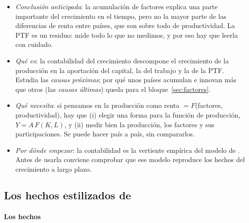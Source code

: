 \documentclass[11pt]{article}
\begin{document}
\begin{itemize}
\item \emph{Conclusión anticipada}: la acumulación de factores explica una parte importante del crecimiento en el tiempo, pero no la mayor parte de las diferencias de renta entre países, que son sobre todo de productividad. La PTF es un residuo: mide todo lo que no medimos, y por eso hay que leerla con cuidado.
\item \emph{Qué es}: la contabilidad del crecimiento descompone el crecimiento de la producción en la aportación del capital, la del trabajo y la de la PTF. Estudia las \emph{causas próximas}; por qué unos países acumulan e innovan más que otros (las \emph{causas últimas}) queda para el bloque~\ref{sec:factores}.
\item \emph{Qué necesita}: si pensamos en la producción como renta $=F$(factores, productividad), hay que (i) elegir una forma para la función de producción, $Y=A\,F(K,L)$, y (ii) medir bien la producción, los factores y sus participaciones. Se puede hacer país a país, sin compararlos.
\item \emph{Por dónde empezar}: la contabilidad es la vertiente empírica del modelo de . Antes de usarla conviene comprobar que ese modelo reproduce los hechos del crecimiento a largo plazo.
\end{itemize}

\subsection{Los hechos estilizados de }\label{sec:kaldor}

\paragraph{Los hechos}
\end{document}
